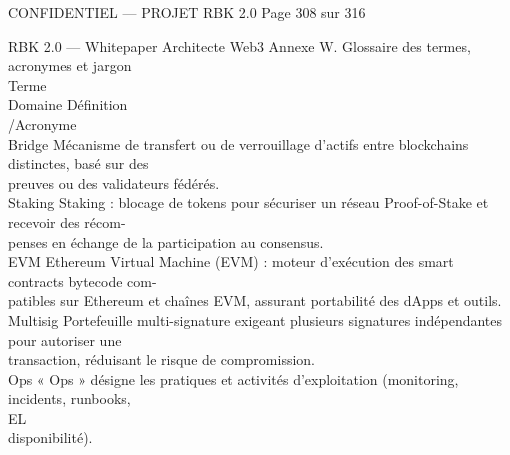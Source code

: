 \vspace{0.5em}
\begin{confidential}CONFIDENTIEL — PROJET RBK 2.0                    Page 308 sur 316\end{confidential}
RBK 2.0 — Whitepaper Architecte Web3                                               Annexe W. Glossaire des termes, acronymes et jargon\\
\vspace{0.5em}
\vspace{0.5em}
Terme\\
Domaine    Définition\\
/Acronyme\\
Bridge                                  Mécanisme de transfert ou de verrouillage d’actifs entre blockchains distinctes, basé sur des\\
preuves ou des validateurs fédérés.\\
\vspace{0.5em}
Staking                                 Staking : blocage de tokens pour sécuriser un réseau Proof-of-Stake et recevoir des récom-\\
penses en échange de la participation au consensus.\\
\vspace{0.5em}
EVM                                     Ethereum Virtual Machine (EVM) : moteur d’exécution des smart contracts bytecode com-\\
patibles sur Ethereum et chaînes EVM, assurant portabilité des dApps et outils.\\
\vspace{0.5em}
Multisig                                Portefeuille multi-signature exigeant plusieurs signatures indépendantes pour autoriser une\\
transaction, réduisant le risque de compromission.\\
\vspace{0.5em}
Ops                                     « Ops » désigne les pratiques et activités d’exploitation (monitoring, incidents, runbooks,\\
\vspace{0.5em}
\vspace{0.5em}
\vspace{0.5em}
\vspace{0.5em}
EL\\
disponibilité).\\
\vspace{0.5em}
\vspace{0.5em}
\vspace{0.5em}
